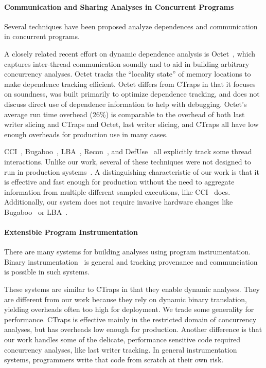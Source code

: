 \documentclass[preprint,10pt]{sigplanconf}
\newcommand{\ctraps}{CTraps\xspace}
\begin{document}
\paragraph{Communication and Sharing Analyses in Concurrent Programs}
Several techniques have been proposed analyze dependences and
communication in concurrent programs.  

A closely related recent effort on dynamic dependence analysis is
Octet~\cite{octet}, which captures inter-thread communication soundly and to
aid in building arbitrary concurrency analyses. Octet tracks the ``locality
state'' of memory locations to make dependence tracking efficient.   Octet
differs from \ctraps in that it focuses on soundness, was built primarily to
optimize dependence tracking, and does not discuss direct use of
dependence information to help with debugging.  Octet's average run time
overhead (26\%) is comparable to the overhead of both last writer slicing and
\ctraps and Octet, last writer slicing, and \ctraps all have low enough
overheads for production use in many cases.

CCI~\cite{cci}, Bugaboo~\cite{bugaboo}, LBA~\cite{paralog}, Recon~\cite{recon},
and DefUse~\cite{defuse} all explicitly track some thread interactions.  Unlike
our work, several of these techniques were not designed to run in production
systems~\cite{recon,defuse}.  A distinguishing characteristic of our work is
that it is effective and fast enough for production without the need to
aggregate information from multiple different sampled executions, like
CCI~\cite{cci} does.  Additionally, our system does not require invasive
hardware changes like Bugaboo~\cite{bugaboo} or LBA~\cite{paralog}.

\paragraph{Extensible Program Instrumentation} 
There are many systems for building analyses using program instrumentation.
Binary instrumentation~\cite{pin,dynamorio,valgrind,roadrunner} is general and
tracking provenance and communciation is possible in such systems.  

These systems are similar to \ctraps in that they enable dynamic analyses.
They are different from our work because they rely on dynamic binary
translation, yielding overheads often too high for deployment.  We trade some
generality for performance. \ctraps is effective mainly in the restricted
domain of concurrency analyses, but has overheads low enough for production.
Another difference is that our work handles some of the delicate, performance
sensitive code required concurrency analyses, like last writer tracking.  In
general instrumentation systems, programmers write that code from scratch at
their own risk.  
\end{document}
